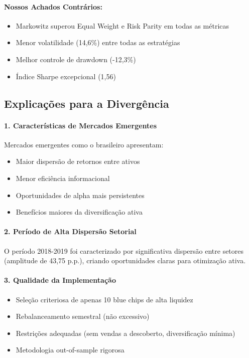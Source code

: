 \paragraph{Nossos Achados Contrários:}
\begin{itemize}
    \item Markowitz superou Equal Weight e Risk Parity em todas as métricas
    \item Menor volatilidade (14,6\%) entre todas as estratégias
    \item Melhor controle de drawdown (-12,3\%)
    \item Índice Sharpe excepcional (1,56)
\end{itemize}

\subsection{Explicações para a Divergência}

\paragraph{1. Características de Mercados Emergentes}
Mercados emergentes como o brasileiro apresentam:
\begin{itemize}
    \item Maior dispersão de retornos entre ativos
    \item Menor eficiência informacional
    \item Oportunidades de alpha mais persistentes
    \item Benefícios maiores da diversificação ativa
\end{itemize}

\paragraph{2. Período de Alta Dispersão Setorial}
O período 2018-2019 foi caracterizado por significativa dispersão entre setores (amplitude de 43,75 p.p.), criando oportunidades claras para otimização ativa.

\paragraph{3. Qualidade da Implementação}
\begin{itemize}
    \item Seleção criteriosa de apenas 10 blue chips de alta liquidez
    \item Rebalanceamento semestral (não excessivo)
    \item Restrições adequadas (sem vendas a descoberto, diversificação mínima)
    \item Metodologia out-of-sample rigorosa
\end{itemize}

